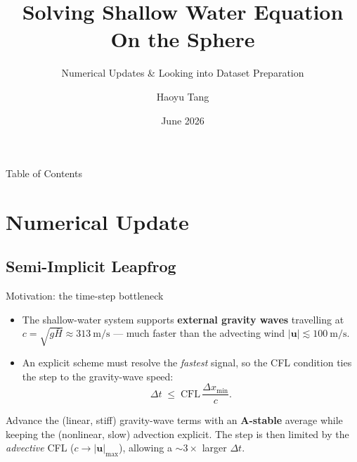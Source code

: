 \documentclass{beamer}
\title{Solving Shallow Water Equation On the Sphere}
\author{Haoyu Tang}
\subtitle{Numerical Updates \& Looking into Dataset Preparation }
\institute[]{University of Illinois at Urbana-Champaign \\ \medskip \small Advisor: Dr. Gan Zhang}
\date{June 2026}
\begin{document}
\maketitle

\begin{frame}{Table of Contents}
    \tableofcontents
\end{frame}


\section{Numerical Update}
\begin{frame}{}
    \begin{center}
        \Huge {}
    \end{center}
\end{frame}

\subsection{Semi-Implicit Leapfrog}

\begin{frame}{Motivation: the time-step bottleneck}
    \begin{itemize}
        \item The shallow-water system supports \textbf{external gravity waves} travelling at
        $c=\sqrt{g\bar H}\approx 313\ \mathrm{m/s}$ --- much faster than the advecting wind
        $|\mathbf{u}|\lesssim 100\ \mathrm{m/s}$.
        \item An explicit scheme must resolve the \emph{fastest} signal, so the CFL condition ties
        the step to the gravity-wave speed:
        $$\Delta t \;\le\; \mathrm{CFL}\,\frac{\Delta x_{\min}}{c}.$$
    \end{itemize}
    \begin{tcolorbox}[colframe=blue!60!white, title=Idea: treat only the gravity-wave terms implicitly]
    Advance the (linear, stiff) gravity-wave terms with an \textbf{A-stable} average while keeping the
    (nonlinear, slow) advection explicit. The step is then limited by the \emph{advective} CFL
    ($c\to |\mathbf u|_{\max}$), allowing a $\sim 3\times$ larger $\Delta t$.
    \end{tcolorbox}
\end{frame}
\end{document}
